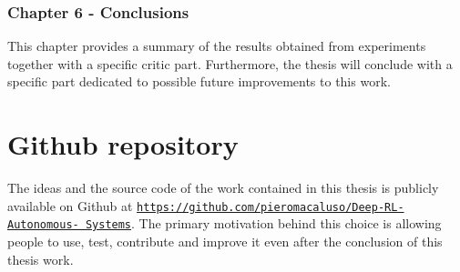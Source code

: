 \subsubsection*{Chapter 6 - Conclusions} 

This chapter provides a summary of the results obtained from experiments together with a specific critic part.
Furthermore, the thesis will conclude with a specific part dedicated to possible future improvements to this work.

\section{Github repository}

The ideas and the source code of the work contained in this thesis is publicly available on Github at \href{https://github.com/pieromacaluso/Deep-RL-Autonomous-Systems}{\texttt{https://github.com/pieromacaluso/Deep-RL-Autonomous- Systems}}. The primary motivation behind this choice is allowing people to use, test, contribute and improve it even after the conclusion of this thesis work.
